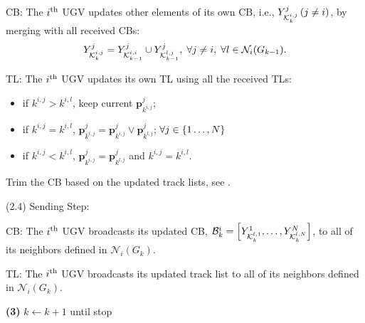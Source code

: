 \begin{algorithm}
\begin{algorithmic}
			CB: The $i^\text{th}$ UGV updates other elements of its own CB, i.e., $Y^j_{\mathcal{K}^{i,j}_{k}}\,(j\neq i)$, by merging with all received CBs:						
			\small\begin{equation*}
				Y^j_{\mathcal{K}^{i,j}_{k}} = Y^j_{\mathcal{K}^{i,i}_{k-1}} \cup Y^j_{\mathcal{K}^{l,j}_{k-1}},
				\; \forall j\neq i,\;\forall l\in \mathcal{N}_i(G_{k-1}).
			\end{equation*}\normalsize
			
			TL: The $i^\text{th}$ UGV updates its own TL using all the received TLs:
			\begin{itemize}
				\item if $k^{i,j}>k^{i,l}$, keep current $\mathbf{p}^j_{k^{i,j}}$;
				\item if $k^{i,j}=k^{i,l}$, $\mathbf{p}^j_{k^{i,j}}=\mathbf{p}^j_{k^{i,j}} \lor \mathbf{p}^j_{k^{l,j}}$; \hspace{2em} $\forall j\in \left\lbrace 1\dots,N\right\rbrace$
				\item if $k^{i,j}<k^{i,l}$, $\mathbf{p}^j_{k^{i,j}}=\mathbf{p}^j_{k^{l,j}}$ and $k^{i,j}=k^{i,l}$.
			\end{itemize}
			
			Trim the CB based on the updated track lists, see . 
			
			\State (2.4) Sending Step:
			
			CB: The $i^\text{th}$ UGV broadcasts its updated CB, \small$\mathcal{B}^i_k=\left[Y^1_{\mathcal{K}^{l,1}_{k}},\dots,Y^N_{\mathcal{K}^{l,N}_{k}}\right]$\normalsize, to all of its neighbors defined in $\mathcal{N}_i(G_k)$.
			
			TL: The $i^\text{th}$ UGV broadcasts its updated track list to all of its neighbors defined in $\mathcal{N}_i(G_k)$.
			
			\State \textbf{(3)} $k\leftarrow k+1$ until stop
		\end{algorithmic}
	\end{algorithm}
	
	\medskip
	
